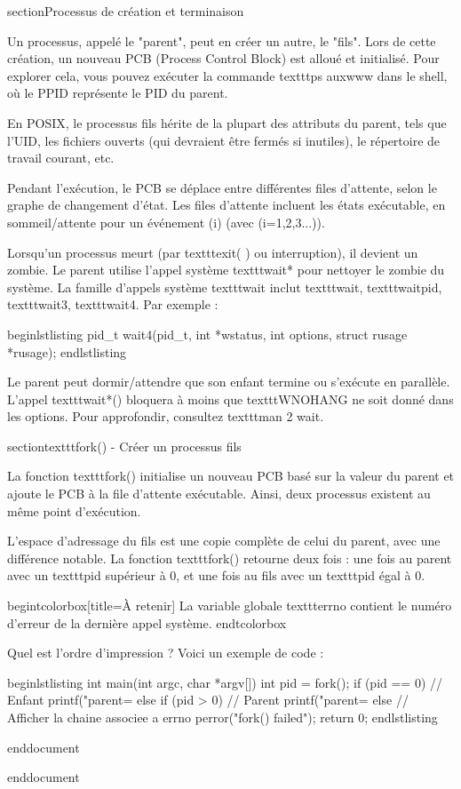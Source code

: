 section{Processus de création et terminaison}

Un processus, appelé le "parent", peut en créer un autre, le "fils". Lors de cette création, un nouveau PCB (Process Control Block) est alloué et initialisé. Pour explorer cela, vous pouvez exécuter la commande texttt{ps auxwww} dans le shell, où le PPID représente le PID du parent.

En POSIX, le processus fils hérite de la plupart des attributs du parent, tels que l'UID, les fichiers ouverts (qui devraient être fermés si inutiles), le répertoire de travail courant, etc.

Pendant l'exécution, le PCB se déplace entre différentes files d'attente, selon le graphe de changement d'état. Les files d'attente incluent les états exécutable, en sommeil/attente pour un événement (i) (avec (i=1,2,3...)).

Lorsqu'un processus meurt (par texttt{exit( )} ou interruption), il devient un zombie. Le parent utilise l'appel système texttt{wait*} pour nettoyer le zombie du système. La famille d'appels système texttt{wait} inclut texttt{wait}, texttt{waitpid}, texttt{wait3}, texttt{wait4}. Par exemple :

begin{lstlisting}
pid_t wait4(pid_t, int *wstatus, int options, struct rusage *rusage);
end{lstlisting}

Le parent peut dormir/attendre que son enfant termine ou s'exécute en parallèle. L'appel texttt{wait*()} bloquera à moins que texttt{WNOHANG} ne soit donné dans les options. Pour approfondir, consultez texttt{man 2 wait}.

section{texttt{fork()} - Créer un processus fils}

La fonction texttt{fork()} initialise un nouveau PCB basé sur la valeur du parent et ajoute le PCB à la file d'attente exécutable. Ainsi, deux processus existent au même point d'exécution.

L'espace d'adressage du fils est une copie complète de celui du parent, avec une différence notable. La fonction texttt{fork()} retourne deux fois : une fois au parent avec un texttt{pid} supérieur à 0, et une fois au fils avec un texttt{pid} égal à 0.

begin{tcolorbox}[title={À retenir}]
La variable globale texttt{errno} contient le numéro d'erreur de la dernière appel système.
end{tcolorbox}

Quel est l'ordre d'impression ? Voici un exemple de code :

begin{lstlisting}
int main(int argc, char *argv[])
{
    int pid = fork();
    if (pid == 0) {
        // Enfant
        printf("parent=%
    }
    else if (pid > 0) {
        // Parent
        printf("parent=%
    }
    else {
        // Afficher la chaine associee a errno
        perror("fork() failed");
    }
    return 0;
}
end{lstlisting}

end{document}

end{document}
